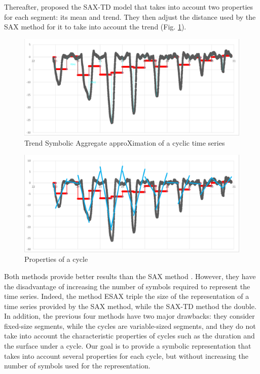 Thereafter, \cite{sun2014improvement} proposed the SAX-TD model that takes into account 
 two properties for each segment: its mean and trend. They then adjust the distance used by the SAX 
 method for it to take into account the trend (Fig. \ref{fig:saxtd}).

 \begin{figure}[h]
  \centering
   \includegraphics[scale=0.4]{images/sax-p/Sax-td}
    \caption{Trend Symbolic Aggregate approXimation of a cyclic time series}
  \label{fig:saxtd}
  \end{figure}
	
	 \begin{figure}[h]
  \centering
   \includegraphics[scale=0.4]{images/sax-p/unD_sax}
    \caption{Properties of a cycle}
  \label{fig:1dsax}
  \end{figure}

Both methods provide better results than the SAX method \cite{sun2014improvement}. However, they have the
disadvantage of increasing the number of symbols required to represent the time series. Indeed, 
the method ESAX triple the size of the representation of a time series provided by the SAX method, 
while the SAX-TD method the double. In addition,  the previous four methods have two major drawbacks: 
they consider fixed-size segments, while the cycles are variable-sized segments, and they do not take into account the characteristic properties of cycles such as 
the duration and the surface under a cycle. Our goal is to provide a symbolic representation that 
takes into account several properties for each cycle, but without increasing the number of symbols 
used for the representation.


